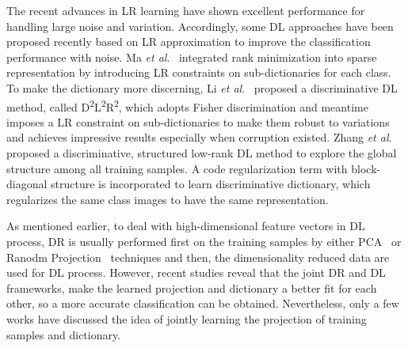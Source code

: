\documentclass[journal]{IEEEtran}
\newcommand{\etal}{\textit{et al}.}
\begin{document}
The recent advances in LR learning have shown excellent performance for handling large noise and variation. Accordingly, some DL approaches have been proposed recently based on LR approximation to improve the classification performance with noise. Ma \etal~\cite{DLRD-SR} integrated rank minimization into sparse representation by introducing LR constraints on sub-dictionaries for each class. To make the dictionary more discerning, Li \etal~\cite{D2L2R2} proposed a discriminative DL method, called D\textsuperscript{2}L\textsuperscript{2}R\textsuperscript{2}, which adopts Fisher discrimination and meantime imposes a LR constraint on sub-dictionaries to make them robust to variations and achieves impressive results especially when corruption existed. Zhang \etal~\cite{Structured-LR-DL} proposed a discriminative, structured low-rank DL method to explore the global structure among all training samples. A code regularization term with block-diagonal structure is incorporated to learn discriminative dictionary, which regularizes the same class images to have the same representation.

As mentioned earlier, to deal with high-dimensional feature vectors in DL process, DR is usually performed first on the training samples by either PCA~\cite{PCA} or Ranodm Projection~\cite{RP} techniques and then, the dimensionality reduced data are used for DL process. However, recent studies reveal that the joint DR and DL frameworks, make the learned projection and dictionary a better fit for each other, so a more accurate classification can be obtained. Nevertheless, only a few works have discussed the idea of jointly learning the projection of training samples and dictionary.
\end{document}

